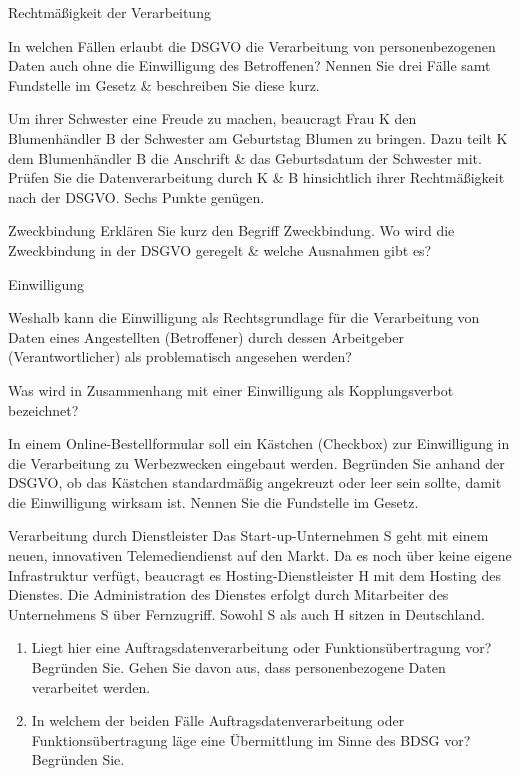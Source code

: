 \documentclass{exercisesheet}
\begin{document}
\begin{exercise}{Rechtmäßigkeit der Verarbeitung}
  \item In welchen Fällen erlaubt die DSGVO die Verarbeitung von personenbezogenen Daten auch ohne die Einwilligung des Betroffenen? Nennen Sie drei Fälle samt Fundstelle im Gesetz \& beschreiben Sie diese kurz.
  \item Um ihrer Schwester eine Freude zu machen, beaucragt Frau K den Blumenhändler B der Schwester am Geburtstag Blumen zu bringen. Dazu teilt K dem Blumenhändler B die Anschrift \& das Geburtsdatum der Schwester mit. Prüfen Sie die Datenverarbeitung durch K \& B hinsichtlich ihrer Rechtmäßigkeit nach der DSGVO. Sechs Punkte genügen.
\end{exercise}

\begin{exercise*}{Zweckbindung}
  Erklären Sie kurz den Begriff Zweckbindung. Wo wird die Zweckbindung in der DSGVO geregelt \& welche Ausnahmen gibt es?
\end{exercise*}

\begin{exercise}{Einwilligung}
  \item Weshalb kann die Einwilligung als Rechtsgrundlage für die Verarbeitung von Daten eines Angestellten (Betroffener) durch dessen Arbeitgeber (Verantwortlicher) als problematisch angesehen werden?
  \item Was wird in Zusammenhang mit einer Einwilligung als Kopplungsverbot bezeichnet?
  \item In einem Online-Bestellformular soll ein Kästchen (Checkbox) zur Einwilligung in die Verarbeitung zu Werbezwecken eingebaut werden. Begründen Sie anhand der DSGVO, ob das Kästchen standardmäßig angekreuzt oder leer sein sollte, damit die Einwilligung wirksam ist. Nennen Sie die Fundstelle im Gesetz.
\end{exercise}

\begin{exercise*}{Verarbeitung durch Dienstleister}
  Das Start-up-Unternehmen S geht mit einem neuen, innovativen Telemediendienst auf den Markt. Da es noch über keine eigene Infrastruktur verfügt, beaucragt es Hosting-Dienstleister H mit dem Hosting des Dienstes. Die Administration des Dienstes erfolgt durch Mitarbeiter des Unternehmens S über Fernzugriff. Sowohl S als auch H sitzen in Deutschland.
  \begin{enumerate}
    \item Liegt hier eine Auftragsdatenverarbeitung oder Funktionsübertragung vor? Begründen Sie. Gehen Sie davon aus, dass personenbezogene Daten verarbeitet werden.
    \item In welchem der beiden Fälle Auftragsdatenverarbeitung oder Funktionsübertragung läge eine Übermittlung im Sinne des BDSG vor? Begründen Sie.
  \end{enumerate}
\end{exercise*}
\end{document}
